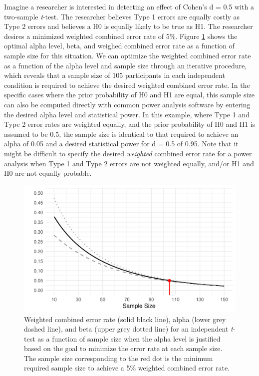 \documentclass[
  english,
  ,man, a4paper,floatsintext]{apa6}
\begin{document}
Imagine a researcher is interested in detecting an effect of Cohen's d = 0.5 with a two-sample \emph{t}-test. The researcher believes Type 1 errors are equally costly as Type 2 errors and believes a H0 is equally likely to be true as H1. The researcher desires a minimized weighted combined error rate of 5\%. Figure \ref{fig:error-plot} shows the optimal alpha level, beta, and weighed combined error rate as a function of sample size for this situation. We can optimize the weighted combined error rate as a function of the alpha level and sample size through an iterative procedure, which reveals that a sample size of 105 participants in each independent condition is required to achieve the desired weighted combined error rate. In the specific cases where the prior probability of H0 and H1 are equal, this sample size can also be computed directly with common power analysis software by entering the desired alpha level and statistical power. In this example, where Type 1 and Type 2 error rates are weighted equally, and the prior probability of H0 and H1 is assumed to be 0.5, the sample size is identical to that required to achieve an alpha of 0.05 and a desired statistical power for d = 0.5 of 0.95. Note that it might be difficult to specify the desired \emph{weighted} combined error rate for a power analysis when Type 1 and Type 2 errors are not weighted equally, and/or H1 and H0 are not equally probable.

\begin{figure}
\centering
\includegraphics{Justify_in_Practice_files/figure-latex/error-plot-1.pdf}
\caption{\label{fig:error-plot}Weighted combined error rate (solid black line), alpha (lower grey dashed line), and beta (upper grey dotted line) for an independent \emph{t}-test as a function of sample size when the alpha level is justified based on the goal to minimize the error rate at each sample size. The sample size corresponding to the red dot is the minimum required sample size to achieve a 5\% weighted combined error rate.}
\end{figure}
\end{document}
